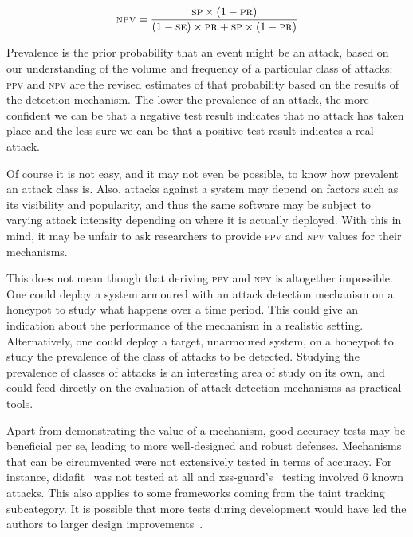\documentclass[10pt,journal,compsoc]{IEEEtran}
\begin{document}
\begin{equation}
\textsc{npv} = \frac{\textsc{sp}\times (1 - \textsc{pr})}{
(1 - \textsc{se})\times \textsc{pr} + \textsc{sp}\times (1 -
\textsc{pr})}
\label{eq:npv-se-sp}
\end{equation}
\vspace{-4mm}

\noindent
Prevalence is the prior probability that an event might be an attack,
based on our understanding of the volume and frequency of a particular
class of attacks; 
\textsc{ppv} and \textsc{npv} are the revised estimates of that
probability based on the results of the detection
mechanism. The lower the prevalence of an attack,
the more confident we can be that a negative test result indicates
that no attack has taken place and the less sure we can be that a
positive test result indicates a real attack. 

Of course it is not easy, and it may not even be possible, to know how
prevalent an attack class is. Also, attacks against a system may depend on
factors such as its visibility and popularity, and thus the same
software may be subject to varying attack intensity depending on
where it is actually deployed. With this in mind, it may be unfair to
ask researchers to provide \textsc{ppv} and \textsc{npv} values for
their mechanisms.

This does not mean though that deriving \textsc{ppv} and \textsc{npv} is
altogether impossible. One could deploy a system armoured with an
attack detection mechanism on a honeypot to study what happens over
a time period. This could give an indication about the performance of
the mechanism in a realistic setting. Alternatively, one could deploy a
target, unarmoured system, on a honeypot to study the prevalence of
the class of attacks to be detected. Studying the prevalence of
classes of attacks is an interesting area of study on its own,
and could feed directly on the evaluation of attack detection
mechanisms as practical tools.

Apart from demonstrating the value of a mechanism, good accuracy tests
may be beneficial per se, leading to more well-designed and robust
defenses. Mechanisms that can be circumvented were not extensively
tested in terms of accuracy. For instance, {\sc didafit}~\cite{LLW02}
was not tested at all and {\sc xss-guard}'s~\cite{BV08}
testing involved 6 known attacks.
This also applies to some frameworks coming from the taint tracking
subcategory. It is possible that more tests during development would
have led the authors to larger design improvements~\cite{Van14}.
\end{document}
